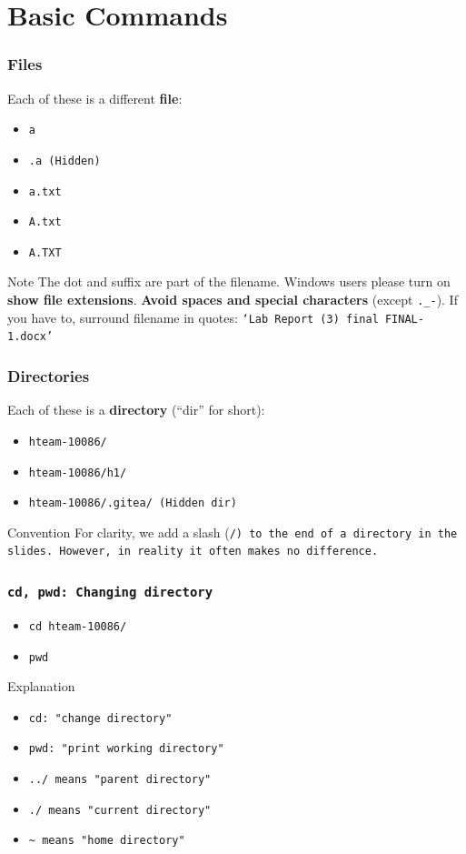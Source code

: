 \documentclass[aspectratio=169]{beamer}
\begin{document}
\section{Basic Commands}

\begin{frame}[fragile]
  \frametitle{Files}
  Each of these is a different \textbf{file}:
  \begin{itemize}
    \item \tt{a}
    \item \tt{.a} (Hidden)
    \item \tt{a.txt}
    \item \tt{A.txt}
    \item \tt{A.TXT}
  \end{itemize}

  \begin{block}{Note}
    The dot and suffix are part of the filename. Windows users please turn on \textbf{show file extensions}.
    \newline \newline
    \textbf{Avoid spaces and special characters} (except \verb|._-|).
    If you have to, surround filename in quotes:
    \tt{`Lab Report (3) final FINAL-1.docx'}
  \end{block}
\end{frame}

\begin{frame}
  \frametitle{Directories}
  Each of these is a \textbf{directory} (``dir'' for short):
  \begin{itemize}
    \item \tt{hteam-10086/}
    \item \tt{hteam-10086/h1/}
    \item \tt{hteam-10086/.gitea/} (Hidden dir)
  \end{itemize}

  \begin{block}{Convention}
    For clarity, we add a slash (\tt{/}) to the end of a directory in the
    slides. However, in reality it often makes no difference.
  \end{block}
\end{frame}

\begin{frame}
  \frametitle{\tt{cd, pwd}: Changing directory}
  \begin{itemize}
    \item \tt{cd hteam-10086/}
    \item \tt{pwd}
  \end{itemize}
  \begin{block}{Explanation}
    \begin{itemize}
      \item \tt{cd}: "change directory"
      \item \tt{pwd}: "print working directory"
      \item \tt{../} means "parent directory"
      \item \tt{./} means "current directory"
      \item \tt{\~{}} means "home directory"
    \end{itemize}
  \end{block}
\end{frame}
\end{document}

